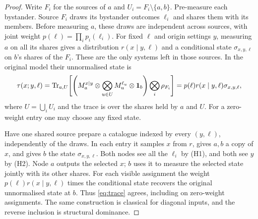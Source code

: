 \begin{proof}
Write $F_i$ for the sources of $a$ and $U_i=F_i\setminus\{a,b\}$. Pre-measure each bystander.
Source $F_i$ draws its bystander outcomes $\ell_i$ and shares them with its members. Before measuring
$a$, these draws are independent across sources, with joint weight $p(\ell)=\prod_i p_i(\ell_i)$.
For fixed $\ell$ and origin settings $y$, measuring $a$ on all its shares gives a distribution
$r(x\mid y,\ell)$ and a conditional state $\sigma_{x,y,\ell}$ on $b$'s shares of the $F_i$.
These are the only systems left in those sources. In the original model their unnormalised state is
\[
 \tau(x;y,\ell)=\operatorname{Tr}_{a,U}\!\left[
  \left(M_a^{x\mid y}\otimes\bigotimes_{u\in U}M_u^{\ell_u}\otimes\mathbf{1}_b\right)
  \bigotimes_i\rho_{F_i}\right]
 =p(\ell)r(x\mid y,\ell)\sigma_{x,y,\ell},
\]
where $U=\bigcup_i U_i$ and the trace is over the shares held by $a$ and $U$.
For a zero-weight entry one may choose any fixed state.

Have one shared source prepare a catalogue indexed by every $(y,\ell)$, independently of the draws.
In each entry it samples $x$ from $r$, gives $a,b$ a copy of $x$, and gives $b$ the state
$\sigma_{x,y,\ell}$. Both nodes see all the $\ell_i$ by (H1), and both see $y$ by (H2).
Node $a$ outputs the selected $x$; $b$ uses it to measure the selected state jointly with its other shares.
For each visible assignment the weight $p(\ell)r(x\mid y,\ell)$ times the conditional state recovers
the original unnormalised state at $b$. Thus \cref{eq:trace} agrees, including on zero-weight assignments.
The same construction is classical for diagonal inputs, and the reverse inclusion is structural dominance.
\end{proof}

